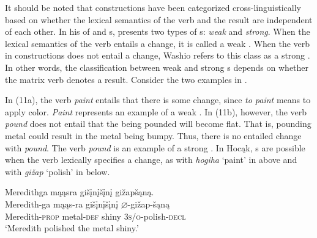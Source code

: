 \documentclass[output=paper]{LSP/langsci}
\begin{document}
It should be noted that  constructions have been categorized cross-linguistically based on whether the lexical semantics of the verb and the result are independent of each other. In his  of  and   s, \citet{Washio1997} presents two types of s: \textit{weak} and \textit{strong}. When the lexical semantics of the verb entails a change, it is called a weak . When the verb in  constructions does not entail a change, Washio refers to this class as a strong . In other words, the classification between weak and strong s depends on whether the matrix verb denotes a result. Consider the two  examples in .

\begin{exe}
\ex\label{ex:rosen:11}
\begin{xlist}



\end{xlist}
\end{exe}
 
In (11a), the verb \textit{paint} entails that there is some change, since \textit{to paint} means to apply color. \textit{Paint} represents an example of a weak . In (11b), however, the verb \textit{pound} does not entail that the  being pounded will become flat. That is, pounding metal could result in the metal being bumpy. Thus, there is no entailed change with \textit{pound}. The verb \textit{pound} is an example of a strong . In Hocąk, s are possible when the verb lexically specifies a change, as with \textit{hogiha} `paint' in  above and with \textit{gižap} `polish' in  below.
 

\begin{exe}
\ex\label{ex:rosen:12}
 \glll Meredithga mąąsra gišįnįšįnį gižapšąną.  \\
 Meredith-ga mąąs-ra gišįnįšįnį {$\varnothing$}-gižap-šąną\\
 Meredith-\textsc{prop} metal-\textsc{def} shiny \textsc{3s/o}-polish-\textsc{decl}\\
\glt `Meredith polished the metal shiny.'

\end{exe}
\end{document}

